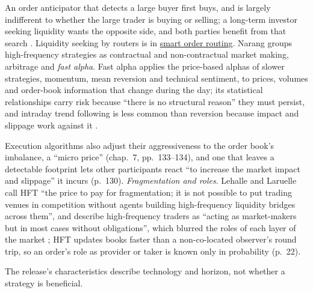 \begin{qfdefinition}
An order anticipator that detects a large buyer first buys, and is largely indifferent to whether the large trader is buying or selling; a long-term investor seeking liquidity wants the opposite side, and both parties benefit from that search \citep[p.~55]{sec-concept-release-2010}. Liquidity seeking by routers is in \hyperref[def:smart-order-routing]{smart order routing}. Narang groups high-frequency strategies as contractual and non-contractual market making, arbitrage and \emph{fast alpha}. Fast alpha applies the price-based alphas of slower strategies, momentum, mean reversion and technical sentiment, to prices, volumes and order-book information that change during the day; its statistical relationships carry risk because ``there is no structural reason'' they must persist, and intraday trend following is less common than reversion because impact and slippage work against it \citep[chap.~15, ``High-Frequency Trading'', sec.~15.4, pp.~291--293]{s7-narang}.

Execution algorithms also adjust their aggressiveness to the order book's imbalance, a ``micro price'' (chap.~7, pp.~133--134), and one that leaves a detectable footprint lets other participants react ``to increase the market impact and slippage'' it incurs (p.~130). \emph{Fragmentation and roles}. Lehalle and Laruelle call HFT ``the price to pay for fragmentation; it is not possible to put trading venues in competition without agents building high-frequency liquidity bridges across them'', and describe high-frequency traders as ``acting as market-makers but in most cases without obligations'', which blurred the roles of each layer of the market \citep[Introduction, pp.~5--6]{alpha-laruelle}; HFT updates books faster than a non-co-located observer's round trip, so an order's role as provider or taker is known only in probability (p.~22).

The release's characteristics describe technology and horizon, not whether a strategy is beneficial.


\end{qfdefinition}
